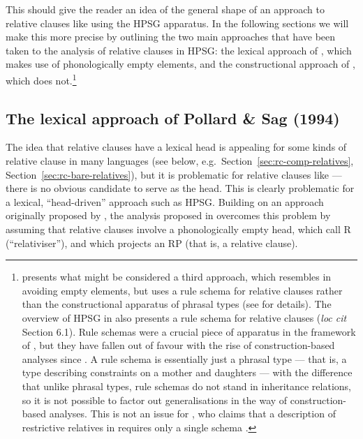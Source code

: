 \documentclass[output=paper,nonflat,draftmode]{./langsci/langscibook}
\begin{document}
This should give the reader an idea of the general shape of an approach to relative
clauses like  using the HPSG apparatus. In the following sections we will make this
more precise by outlining the two main approaches that have been taken to the analysis of
relative clauses in HPSG: the lexical approach of \cite[Chapter~5]{Pollard:Sag:94}, which
makes use of phonologically empty elements, and the constructional approach of
\cite{Sag:97}, which does not.\footnote{\cite{Mueller99b} presents what might be
  considered a third approach, which resembles \cite{Sag:97} in avoiding empty elements,
  but uses a rule schema for  relative clauses rather than the constructional apparatus
  of phrasal types (see \citealt[95]{Mueller99b} for details). The overview of HPSG in
  \cite{MuellerCurrentApproaches} also presents a rule schema for relative clauses
  (\emph{loc cit} Section 6.1). Rule schemas were a crucial piece of apparatus in the framework of
  \cite{Pollard:Sag:94}, but they have fallen out of favour with the rise of construction-based 
  analyses since \cite{Sag:97}. A rule schema is essentially just a phrasal type ---
  that is, a type describing constraints on a mother and daughters --- with the difference
  that unlike phrasal types, rule schemas do not stand in inheritance relations, so it is
  not possible to factor out generalisations in the way of construction-based
  analyses. This is not an issue for \citeauthor{Mueller99b}, who claims that a
  description of restrictive relatives in  requires only a single schema
  \citep[74]{Mueller99b}.}

\subsection{The lexical approach of Pollard \& Sag (1994)}
\label{sec:rc-pollard--sag}

The idea that relative clauses have a lexical head is appealing for some kinds of relative
clause in many languages (see below, e.g.\ Section~\ref{sec:rc-comp-relatives},
Section~\ref{sec:rc-bare-relatives}), but it is problematic for relative clauses like
 --- there is no obvious candidate to serve as the head.  This is clearly
problematic for a lexical, ``head-driven'' approach such as HPSG. Building on an approach originally
proposed by \cite{borsley1989phrase}, the analysis proposed in
\cite[Chapter~5]{Pollard:Sag:94} overcomes this problem by assuming that relative clauses
involve a phonologically empty head, which \citeauthor{Pollard:Sag:94} call R
(``relativiser''), and which projects an RP (that is, a relative clause).
\end{document}
